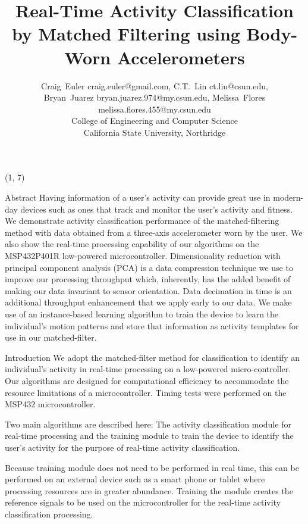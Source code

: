 \documentclass[unknownkeysallowed,final]{beamer}
\title{\normalsize{Real-Time Activity Classification by Matched Filtering using Body-Worn Accelerometers}}
\author{\small{Craig~Euler craig.euler@gmail.com, C.T.~Lin ct.lin@csun.edu,\\Bryan~Juarez bryan.juarez.974@my.csun.edu, Melissa~Flores melissa.flores.455@my.csun.edu\\College of Engineering and Computer Science\\California State University, Northridge}}
\date{}
\begin{document}
\tiny{}
\begin{frame}{} 

\begin{textblock}{19.5}(1, 7)

\begin{block}{\small{Abstract}}
Having information of a user's activity can provide great use in modern-day devices such as ones that track and monitor the user's activity and fitness.
We demonstrate activity classification performance of the matched-filtering method with data obtained from a three-axis accelerometer worn by the user.
We also show the real-time processing capability of our algorithms on the MSP432P401R low-powered microcontroller.
Dimensionality reduction with principal component analysis (PCA) \cite{bishop_2006} is a data compression technique we use to improve our processing throughput which, inherently, has the added benefit of making     our data invariant to sensor orientation.
Data decimation in time is an additional throughput enhancement that we apply early to our data.
We make use of an instance-based learning algorithm to train the device to learn the individual's motion patterns and store that information as activity templates for use in our matched-filter.
\end{block}

\begin{block}{\small{Introduction}}
We adopt the matched-filter method for classification to identify an individual's activity in real-time processing on a low-powered micro-controller.
Our algorithms are designed for computational efficiency to accommodate the resource limitations of a microcontroller.
Timing tests were performed on the MSP432 microcontroller.

Two main algorithms are described here: The activity classification module for real-time processing and the training module to train the device to identify the user's activity for the purpose of real-time activity classification.

Because training module does not need to be performed in real time, this can be performed on an external device such as a smart phone or tablet where processing resources are in greater abundance.
Training the module creates the reference signals to be used on the microcontroller for the real-time activity classification processing.
\end{block}


\end{textblock}
\end{frame}
\end{document}
